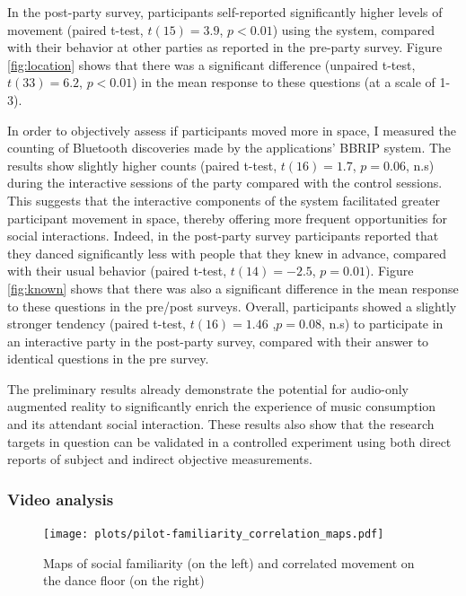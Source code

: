 \documentclass[a4paper,11pt]{article}
\begin{document}
{In the post-party survey, participants self-reported significantly higher levels of movement (paired t-test, $t(15)=3.9$, $p<0.01$) using the system, compared with their behavior at other parties as reported in the pre-party survey.
Figure \ref{fig:location} shows that there was a significant difference (unpaired t-test, $t(33)=6.2$, $p<0.01$) in the mean response to these questions (at a scale of 1-3).

In order to objectively assess if participants moved more in space, I measured the counting of Bluetooth discoveries made by the applications' BBRIP system.
The results show slightly higher counts (paired t-test, $t(16)=1.7$, $p=0.06$, n.s) during the interactive sessions of the party compared with the control sessions.
This suggests that the interactive components of the system facilitated greater participant movement in space, thereby offering more frequent opportunities for social interactions.
Indeed, in the post-party survey participants reported that they danced significantly less with people that they knew in advance, compared with their usual behavior (paired t-test, $t(14)=-2.5$, $p=0.01$).
Figure \ref{fig:known} shows that there was also a significant difference in the mean response to these questions in the pre/post surveys.
Overall, participants showed a slightly stronger tendency (paired t-test, $t(16)=1.46$ ,$p=0.08$, n.s) to participate in an interactive party in the post-party survey, compared with their answer to identical questions in the pre survey.

The preliminary results already demonstrate the potential for audio-only augmented reality to significantly enrich the experience of music consumption and its attendant social interaction.
These results also show that the research targets in question can be validated in a controlled experiment using both direct reports of subject and indirect objective measurements.

\subsubsection{Video analysis}\label{exp1:results:video}

\begin{figure}[!htb]
    \centering
    \texttt{[image: plots/pilot-familiarity\_correlation\_maps.pdf]}
    \caption{Maps of social familiarity (on the left) and correlated movement on the dance floor (on the right)}\label{plot:pilot-familiarity_correlation_maps}
\end{figure}

}
\end{document}

